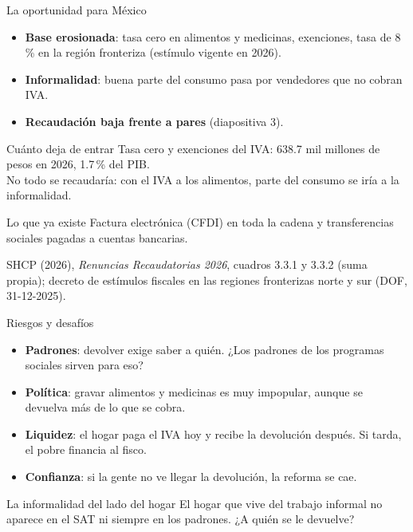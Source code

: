 \documentclass[aspectratio=169,11pt]{beamer}
\newcommand{\fuente}[1]{\par\vfill{\small\color{cGris}#1\par}}
\begin{document}
\begin{frame}{La oportunidad para México}
  \begin{itemize}
    \item \textbf{Base erosionada}: tasa cero en alimentos y medicinas, exenciones, tasa de 8\,\% en la región fronteriza (estímulo vigente en 2026).
    \item \textbf{Informalidad}: buena parte del consumo pasa por vendedores que no cobran IVA.
    \item \textbf{Recaudación baja frente a pares} (diapositiva 3).
  \end{itemize}
  \pause
  \begin{block}{Cuánto deja de entrar}
    Tasa cero y exenciones del IVA: 638.7 mil millones de pesos en 2026, 1.7\,\% del PIB.\\[2pt]
    {\small No todo se recaudaría: con el IVA a los alimentos, parte del consumo se iría a la informalidad.}
  \end{block}
  \pause
  \begin{block}{Lo que ya existe}
    Factura electrónica (CFDI) en toda la cadena y transferencias sociales pagadas a cuentas bancarias.
  \end{block}
  \fuente{SHCP (2026), \emph{Renuncias Recaudatorias 2026}, cuadros 3.3.1 y 3.3.2 (suma propia); decreto de estímulos fiscales en las regiones fronterizas norte y sur (DOF, 31-12-2025).}
\end{frame}

\begin{frame}{Riesgos y desafíos}
  \begin{itemize}
    \item \textbf{Padrones}: devolver exige saber a quién. ¿Los padrones de los programas sociales sirven para eso?
    \item \textbf{Política}: gravar alimentos y medicinas es muy impopular, aunque se devuelva más de lo que se cobra.
    \item \textbf{Liquidez}: el hogar paga el IVA hoy y recibe la devolución después. Si tarda, el pobre financia al fisco.
    \item \textbf{Confianza}: si la gente no ve llegar la devolución, la reforma se cae.
  \end{itemize}
  \pause
  \begin{alertblock}{La informalidad del lado del hogar}
    El hogar que vive del trabajo informal no aparece en el SAT ni siempre en los padrones. ¿A quién se le devuelve?
  \end{alertblock}
\end{frame}
\end{document}
